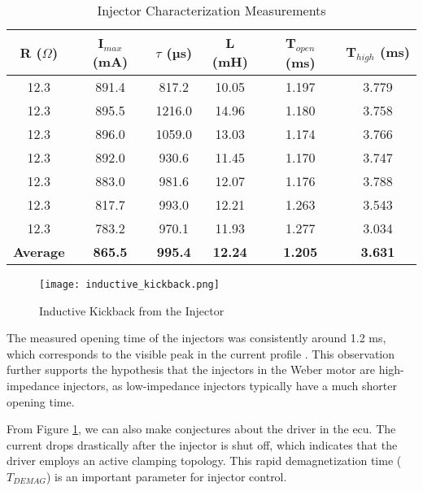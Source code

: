     \begin{table}[H]
        \centering
        \caption{Injector Characterization Measurements}
        \label{tab:injector_measurements}
        \begin{tabular}{|c|c|c|c|c|c|}
            \hline
            \textbf{R ($\Omega$)} & \textbf{I$_{max}$ (mA)} & \textbf{$\tau$ (µs)} & \textbf{L (mH)} & \textbf{T$_{open}$ (ms)} & \textbf{T$_{high}$ (ms)} \\
            \hline
            12.3 & 891.4 & 817.2 & 10.05 & 1.197 & 3.779 \\
            12.3 & 895.5 & 1216.0 & 14.96 & 1.180 & 3.758 \\
            12.3 & 896.0 & 1059.0 & 13.03 & 1.174 & 3.766 \\
            12.3 & 892.0 & 930.6 & 11.45 & 1.170 & 3.747 \\
            12.3 & 883.0 & 981.6 & 12.07 & 1.176 & 3.788 \\
            12.3 & 817.7 & 993.0 & 12.21 & 1.263 & 3.543 \\
            12.3 & 783.2 & 970.1 & 11.93 & 1.277 & 3.034 \\
            \hline
            \textbf{Average} & \textbf{865.5} & \textbf{995.4} & \textbf{12.24} & \textbf{1.205} & \textbf{3.631} \\
            \hline
        \end{tabular}
    \end{table}

    \begin{figure}[H]
        \centering
        \texttt{[image: inductive\_kickback.png]}
        \caption{Inductive Kickback from the Injector}
        \label{fig:inductive_kickback}
    \end{figure}

    The measured opening time of the injectors was consistently around 1.2 ms, which corresponds to the visible peak in the current profile \autocite{wieclawskiElectricCurrentWaveform2020}. This observation further supports the hypothesis that the injectors in the Weber motor are high-impedance injectors, as low-impedance injectors typically have a much shorter opening time.

    From Figure \ref{fig:inductive_kickback}, we can also make conjectures about the driver in the \gls{ecu}. The current drops drastically after the injector is shut off, which indicates that the driver employs an active clamping topology. This rapid demagnetization time ($T_{DEMAG}$) is an important parameter for injector control.

